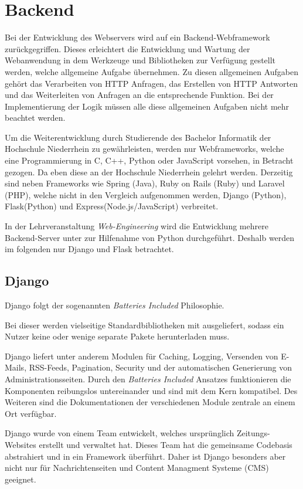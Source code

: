 \section{Backend} \label{sec:Backend}
Bei der Entwicklung des Webservers wird auf ein Backend-Webframework zurückgegriffen. Dieses erleichtert die Entwicklung und Wartung der Webanwendung in dem Werkzeuge und Bibliotheken zur Verfügung gestellt werden, welche allgemeine Aufgabe übernehmen. Zu diesen allgemeinen Aufgaben gehört das Verarbeiten von HTTP Anfragen, das Erstellen von HTTP Antworten und das Weiterleiten von Anfragen an die entsprechende Funktion. Bei der Implementierung der Logik müssen alle diese allgemeinen Aufgaben nicht mehr beachtet werden.

Um die Weiterentwicklung durch Studierende des Bachelor Informatik der Hochschule Niederrhein zu gewährleisten, werden nur Webframeworks, welche eine Programmierung in C, C++, Python oder JavaScript vorsehen, in Betracht gezogen. Da eben diese an der Hochschule Niederrhein gelehrt werden. Derzeitig sind neben Frameworks wie Spring (Java), Ruby on Rails (Ruby) und Laravel (PHP), welche nicht in den Vergleich aufgenommen werden, Django (Python), Flask(Python) und Express(Node.js/JavaScript) verbreitet.\cite{mdncontributorsServersideWebFrameworks2020}

In der Lehrveranstaltung \textit{Web-Engineering} wird die Entwicklung mehrere Backend-Server unter zur Hilfenahme von Python durchgeführt. Deshalb werden im folgenden nur Django und Flask betrachtet.

\subsection{Django}
Django folgt der sogenannten \textit{Batteries Included} Philosophie. 

Bei dieser werden vielseitige Standardbibliotheken mit ausgeliefert, sodass ein Nutzer keine oder wenige separate Pakete herunterladen muss.\cite{kuchlingPEP206Python}

Django liefert unter anderem Modulen für Caching, Logging, Versenden von E-Mails, RSS-Feeds, Pagination, Security und der automatischen Generierung von Administrationsseiten. \cite{djangoDjangoDocumentationDjango} Durch den \textit{Batteries Included} Ansatzes funktionieren die Komponenten reibungslos untereinander und sind mit dem Kern kompatibel. Des Weiteren sind die Dokumentationen der verschiedenen Module zentrale an einem Ort verfügbar. 

Django wurde von einem Team entwickelt, welches ursprünglich Zeitungs-Websites erstellt und verwaltet hat. Dieses Team hat die gemeinsame Codebasis abstrahiert und in ein Framework überführt. Daher ist Django besonders aber nicht nur für Nachrichtenseiten und Content Managment Systeme (CMS) geeignet. \cite{mdncontributorsDjangoIntroduction2019}

